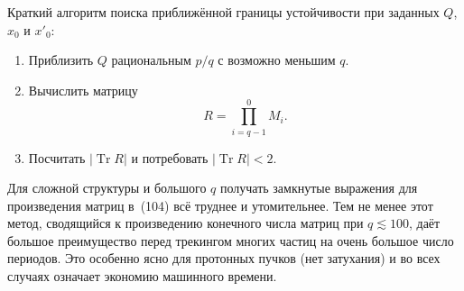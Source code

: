 \documentclass[11pt,a4paper]{article}
\DeclareMathOperator{\Tr}{Tr}
\begin{document}
Краткий алгоритм поиска приближённой границы устойчивости при заданных $Q$,
$x_0$ и $x'_0$:

\begin{enumerate}
\item[(i)] Приблизить $Q$ рациональным $p/q$ с возможно меньшим $q$.
\item[(ii)] Вычислить матрицу
\begin{equation}
R=\prod_{i=q-1}^{0} M_i.
\end{equation}
\item[(iii)] Посчитать $|\Tr R|$ и потребовать $|\Tr R|<2$.
\end{enumerate}

Для сложной структуры и большого $q$ получать замкнутые выражения для
произведения матриц в~(104) всё труднее и утомительнее. Тем не менее этот метод,
сводящийся к произведению конечного числа матриц при $q\lesssim 100$, даёт
большое преимущество перед трекингом многих частиц на очень большое число
периодов. Это особенно ясно для протонных пучков (нет затухания) и во всех
случаях означает экономию машинного времени.
\end{document}
